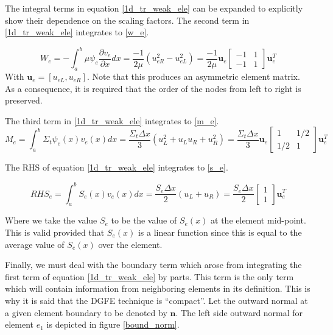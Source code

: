 The integral terms in equation \ref{1d_tr_weak_ele} can be expanded to explicitly show their dependence on the scaling factors.  The second term in \ref{1d_tr_weak_ele} integrates to \ref{w_e}.

\begin{equation}
W_e = -\int_a^b \mu \psi_e \frac{\partial v_e}{\partial x} dx = \frac{-1}{2\mu}(u_{eR}^2 - u_{eL}^2) = 
\frac{-1}{2\mu} \mathbf u_e 
\begin{bmatrix}
    -1      & 1 \\
    -1       & 1 
\end{bmatrix}
\mathbf u_e^T
\label{w_e}
\end{equation}
With $\mathbf u_e = [u_{eL}, u_{eR}]$.  Note that this produces an asymmetric element matrix.  As a consequence, it is required that the order of the nodes from left to right is preserved.

The third term in \ref{1d_tr_weak_ele} integrates to \ref{m_e}.
\begin{equation}
M_e = \int_a^b \Sigma_t \psi_e(x)v_e(x) dx =
\frac{\Sigma_t \Delta x}{3} (u_L^2 + u_L u_R + u_R^2) = 
\frac{\Sigma_t \Delta x}{3} \mathbf u_e 
\begin{bmatrix}
    1      & 1/2 \\
    1/2      & 1 
\end{bmatrix}
\mathbf u_e^T
\label{m_e}
\end{equation}

The RHS of equation \ref{1d_tr_weak_ele} integrates to \ref{s_e}.

\begin{equation}
RHS_e = \int_a^b S_e(x)v_e(x) dx =
\frac{S_e \Delta x}{2} (u_L + u_R) = 
\frac{S_e \Delta x}{2}
\begin{bmatrix}
    1     \\
    1 
\end{bmatrix}
\mathbf u_e^T
\label{s_e}
\end{equation}

Where we take the value $S_e$ to be the value of $S_e(x)$ at the element mid-point.  This is valid provided that $S_e(x)$ is a linear function since this is equal to the average value of $S_e(x)$ over the element.

Finally, we must deal with the boundary term which arose from integrating the first term of equation \ref{1d_tr_weak_ele} by parts.  This term is the only term which will contain information from neighboring elements in its definition.  This is why it is said that the DGFE technique is ``compact''. Let the outward normal at a given element boundary to be denoted by $\mathbf n$.  The left side outward normal for element $e_1$ is depicted in figure \ref{bound_norm}.

